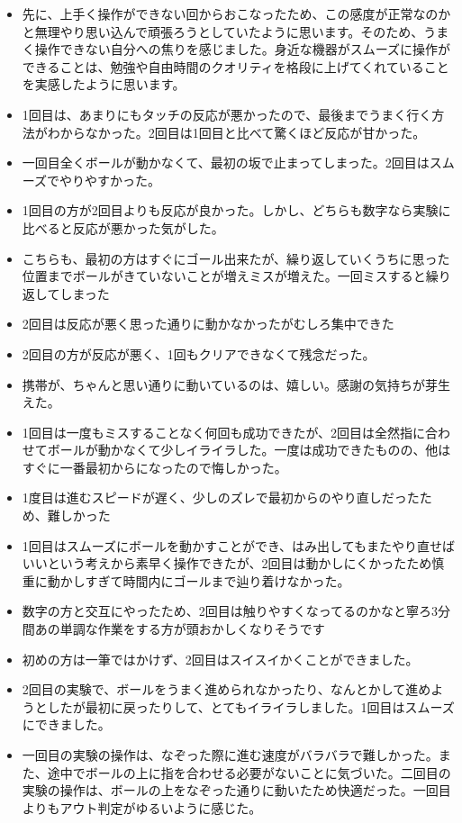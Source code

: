 \begin{itemize}
  \item 先に、上手く操作ができない回からおこなったため、この感度が正常なのかと無理やり思い込んで頑張ろうとしていたように思います。そのため、うまく操作できない自分への焦りを感じました。身近な機器がスムーズに操作ができることは、勉強や自由時間のクオリティを格段に上げてくれていることを実感したように思います。
  \item 1回目は、あまりにもタッチの反応が悪かったので、最後までうまく行く方法がわからなかった。2回目は1回目と比べて驚くほど反応が甘かった。
  \item 一回目全くボールが動かなくて、最初の坂で止まってしまった。2回目はスムーズでやりやすかった。
  \item 1回目の方が2回目よりも反応が良かった。しかし、どちらも数字なら実験に比べると反応が悪かった気がした。
  \item こちらも、最初の方はすぐにゴール出来たが、繰り返していくうちに思った位置までボールがきていないことが増えミスが増えた。一回ミスすると繰り返してしまった
  \item 2回目は反応が悪く思った通りに動かなかったがむしろ集中できた
  \item 2回目の方が反応が悪く、1回もクリアできなくて残念だった。
  \item 携帯が、ちゃんと思い通りに動いているのは、嬉しい。感謝の気持ちが芽生えた。
  \item 1回目は一度もミスすることなく何回も成功できたが、2回目は全然指に合わせてボールが動かなくて少しイライラした。一度は成功できたものの、他はすぐに一番最初からになったので悔しかった。
  \item 1度目は進むスピードが遅く、少しのズレで最初からのやり直しだったため、難しかった
  \item 1回目はスムーズにボールを動かすことができ、はみ出してもまたやり直せばいいという考えから素早く操作できたが、2回目は動かしにくかったため慎重に動かしすぎて時間内にゴールまで辿り着けなかった。
  \item 数字の方と交互にやったため、2回目は触りやすくなってるのかなと寧ろ3分間あの単調な作業をする方が頭おかしくなりそうです
  \item 初めの方は一筆ではかけず、2回目はスイスイかくことができました。
  \item 2回目の実験で、ボールをうまく進められなかったり、なんとかして進めようとしたが最初に戻ったりして、とてもイライラしました。1回目はスムーズにできました。
  \item 一回目の実験の操作は、なぞった際に進む速度がバラバラで難しかった。また、途中でボールの上に指を合わせる必要がないことに気づいた。二回目の実験の操作は、ボールの上をなぞった通りに動いたため快適だった。一回目よりもアウト判定がゆるいように感じた。

\end{itemize}
